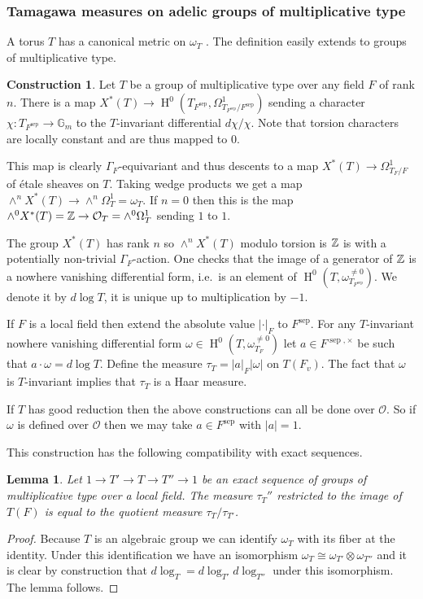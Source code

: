 \documentclass[a4paper,11pt,reqno]{amsart}
\newcommand{\G}{\mathbb{G}}
\DeclareMathOperator{\HH}{H}
\DeclareMathOperator{\sep}{sep}
\newtheorem{lemma}[theorem]{Lemma}
\theoremstyle{definition}
\newtheorem{construction}[theorem]{Construction}
\begin{document}
\subsubsection{Tamagawa measures on adelic groups of multiplicative type}
A torus $T$ has a canonical metric on $\omega_T$ \cite[Def. 3.29]{Salberger1998Tamagawa}. The definition easily extends to groups of multiplicative type.
\begin{construction}\label{cons: Construction of local measures on groups of multiplicative type}
	Let $T$ be a group of multiplicative type over any field $F$ of rank $n$. There is a map $X^*(T) \to \HH^0(T_{F^{\sep}}, \Omega_{T_{F^{\sep}}/F^{\sep}}^1)$ sending a character $\chi: T_{F^{\sep}} \to \G_m$ to the $T$-invariant differential $d\chi /\chi$. Note that torsion characters are locally constant and are thus mapped to $0$.
	
	This map is clearly $\Gamma_F$-equivariant and thus descents to a map $X^{*}(T) \to \Omega_{T_{F}/F}^1$ of \'etale sheaves on $T$. Taking wedge products we get a map $\wedge^n X^*(T) \to \wedge^n \Omega_T^1 = \omega_T$. If $n = 0$ then this is the map $\wedge^0 X^*(T) = \mathbb{Z} \to \mathcal{O}_T = \wedge^0 \Omega_T^1$ sending $1$ to $1$. 
	
	The group $X^*(T)$ has rank $n$ so $\wedge^n X^*(T)$ modulo torsion is $\mathbb{Z}$ is with a potentially non-trivial $\Gamma_F$-action. One checks that the image of a generator of $\mathbb{Z}$ is a nowhere vanishing differential form, i.e.~is an element of $\HH^0(T,\omega_{T_{F^{\sep}}}^{\neq 0})$. We denote it by $d \log T$, it is unique up to multiplication by $-1$.
	
	If $F$ is a local field then extend the absolute value $|\cdot|_F$ to $F^{\sep}$. For any $T$-invariant nowhere vanishing differential form $\omega \in \HH^0(T,\omega_{T_{F}}^{\neq 0})$ let $a \in F^{\sep, \times}$ be such that $a \cdot \omega = d\log T$. Define the measure $\tau_T = |a|_F |\omega|$ on $T(F_v)$. The fact that $\omega$ is $T$-invariant implies that $\tau_T$ is a Haar measure.
	
	If $T$ has good reduction then the above constructions can all be done over $\mathcal{O}$. So if $\omega$ is defined over $\mathcal{O}$ then we may take $a \in F^{\sep}$ with $|a| = 1$.
\end{construction}

This construction has the following compatibility with exact sequences.
\begin{lemma}\label{lem:compatibility of tamagawa measures of groups of multiplicative type}
	Let $1 \to T' \to T \to T'' \to 1$ be an exact sequence of groups of multiplicative type over a local field. The measure $\tau_T''$ restricted to the image of $T(F)$ is equal to the quotient measure $\tau_T/\tau_{T'}$.
\end{lemma}
\begin{proof}
	Because $T$ is an algebraic group we can identify $\omega_T$ with its fiber at the identity. Under this identification we have an isomorphism $\omega_T \cong \omega_{T'} \otimes \omega_{T''}$ and it is clear by construction that $d \log_T = d \log_{T'} d \log_{T''}$ under this isomorphism. The lemma follows.
\end{proof}
\end{document}
